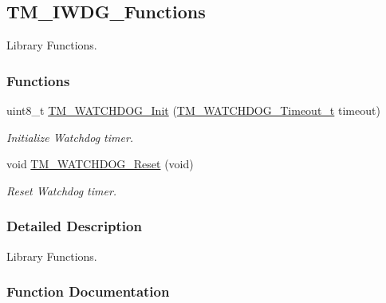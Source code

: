 \hypertarget{group___t_m___i_w_d_g___functions}{}\subsection{T\+M\+\_\+\+I\+W\+D\+G\+\_\+\+Functions}
\label{group___t_m___i_w_d_g___functions}


Library Functions.  


\subsubsection*{Functions}
\begin{DoxyCompactItemize}
\item 
uint8\+\_\+t \hyperlink{group___t_m___i_w_d_g___functions_gafd88c97066851c92fe25c1b5c2cd74cf}{T\+M\+\_\+\+W\+A\+T\+C\+H\+D\+O\+G\+\_\+\+Init} (\hyperlink{group___t_m___i_w_d_g___typedefs_ga3c9514e409e8cc70048b868ca9a64671}{T\+M\+\_\+\+W\+A\+T\+C\+H\+D\+O\+G\+\_\+\+Timeout\+\_\+t} timeout)
\begin{DoxyCompactList}\small\item\em Initialize Watchdog timer. \end{DoxyCompactList}\item 
void \hyperlink{group___t_m___i_w_d_g___functions_ga73a095378efd3426d63a1879f582220b}{T\+M\+\_\+\+W\+A\+T\+C\+H\+D\+O\+G\+\_\+\+Reset} (void)
\begin{DoxyCompactList}\small\item\em Reset Watchdog timer. \end{DoxyCompactList}\end{DoxyCompactItemize}


\subsubsection{Detailed Description}
Library Functions. 



\subsubsection{Function Documentation}
\hypertarget{group___t_m___i_w_d_g___functions_gafd88c97066851c92fe25c1b5c2cd74cf}{}
